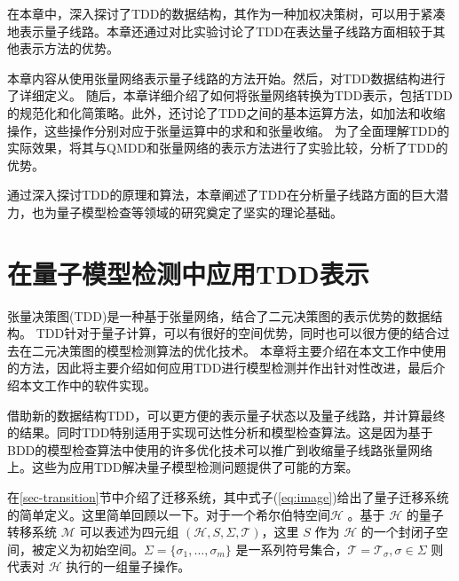 在本章中，深入探讨了TDD的数据结构，其作为一种加权决策树，可以用于紧凑地表示量子线路。本章还通过对比实验讨论了TDD在表达量子线路方面相较于其他表示方法的优势。

本章内容从使用张量网络表示量子线路的方法开始。然后，对TDD数据结构进行了详细定义。
随后，本章详细介绍了如何将张量网络转换为TDD表示，包括TDD的规范化和化简策略。此外，还讨论了TDD之间的基本运算方法，如加法和收缩操作，这些操作分别对应于张量运算中的求和和张量收缩。
为了全面理解TDD的实际效果，将其与QMDD和张量网络的表示方法进行了实验比较，分析了TDD的优势。

通过深入探讨TDD的原理和算法，本章阐述了TDD在分析量子线路方面的巨大潜力，也为量子模型检查等领域的研究奠定了坚实的理论基础。
\chapter{在量子模型检测中应用TDD表示}
张量决策图(TDD)是一种基于张量网络，结合了二元决策图的表示优势的数据结构。
TDD针对于量子计算，可以有很好的空间优势，同时也可以很方便的结合过去在二元决策图的模型检测算法的优化技术。
本章将主要介绍在本文工作中使用的方法，因此将主要介绍如何应用TDD进行模型检测并作出针对性改进，最后介绍本文工作中的软件实现。

借助新的数据结构TDD，可以更方便的表示量子状态以及量子线路，并计算最终的结果。同时TDD特别适用于实现可达性分析和模型检查算法。这是因为基于BDD的模型检查算法中使用的许多优化技术可以推广到收缩量子线路张量网络上\citep{Chaki_2018}。这些为应用TDD解决量子模型检测问题提供了可能的方案。

在\ref{sec-transition}节中介绍了迁移系统，其中式子(\ref{eq:image})给出了量子迁移系统的简单定义。这里简单回顾以一下。对于一个希尔伯特空间$\mathcal{H}$ 。基于 $\mathcal{H}$ 的量子转移系统 $\mathcal{M}$ 可以表述为四元组 $(\mathcal{H}, S, \Sigma, \mathcal{T})$，这里 $S$ 作为 $\mathcal{H}$ 的一个封闭子空间，被定义为初始空间。$\Sigma=\{\sigma_1,\ldots,\sigma_m\}$ 是一系列符号集合，$\mathcal{T}=\mathcal{T}_\sigma, {\sigma \in \Sigma}$ 则代表对 $\mathcal{H}$ 执行的一组量子操作。


